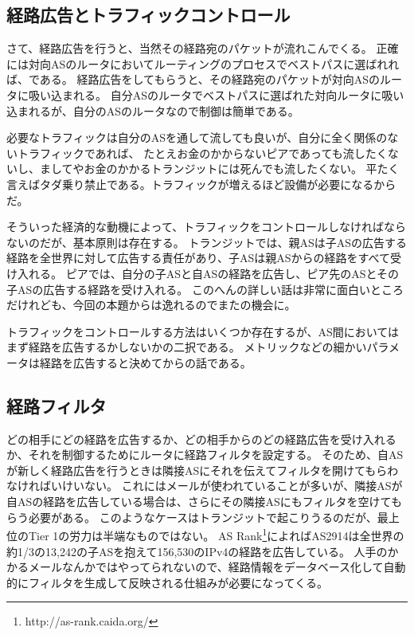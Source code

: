 \subsection{経路広告とトラフィックコントロール}

さて、経路広告を行うと、当然その経路宛のパケットが流れこんでくる。
正確には対向ASのルータにおいてルーティングのプロセスでベストパスに選ばれれば、である。
経路広告をしてもらうと、その経路宛のパケットが対向ASのルータに吸い込まれる。
自分ASのルータでベストパスに選ばれた対向ルータに吸い込まれるが、自分のASのルータなので制御は簡単である。

必要なトラフィックは自分のASを通して流しても良いが、自分に全く関係のないトラフィックであれば、
たとえお金のかからないピアであっても流したくないし、ましてやお金のかかるトランジットには死んでも流したくない。
平たく言えばタダ乗り禁止である。トラフィックが増えるほど設備が必要になるからだ。

そういった経済的な動機によって、トラフィックをコントロールしなければならないのだが、基本原則は存在する。
トランジットでは、親ASは子ASの広告する経路を全世界に対して広告する責任があり、子ASは親ASからの経路をすべて受け入れる。
ピアでは、自分の子ASと自ASの経路を広告し、ピア先のASとその子ASの広告する経路を受け入れる。
このへんの詳しい話は非常に面白いところだけれども、今回の本題からは逸れるのでまたの機会に。

トラフィックをコントロールする方法はいくつか存在するが、AS間においてはまず経路を広告するかしないかの二択である。
メトリックなどの細かいパラメータは経路を広告すると決めてからの話である。

\subsection{経路フィルタ}

どの相手にどの経路を広告するか、どの相手からのどの経路広告を受け入れるか、それを制御するためにルータに経路フィルタを設定する。
そのため、自ASが新しく経路広告を行うときは隣接ASにそれを伝えてフィルタを開けてもらわなければいけいない。
これにはメールが使われていることが多いが、隣接ASが自ASの経路を広告している場合は、さらにその隣接ASにもフィルタを空けてもらう必要がある。
このようなケースはトランジットで起こりうるのだが、最上位のTier 1の労力は半端なものではない。
AS Rank\footnote{http://as-rank.caida.org/}によればAS2914は全世界の約1/3の13,242の子ASを抱えて156,530のIPv4の経路を広告している。
人手のかかるメールなんかではやってられないので、経路情報をデータベース化して自動的にフィルタを生成して反映される仕組みが必要になってくる。

